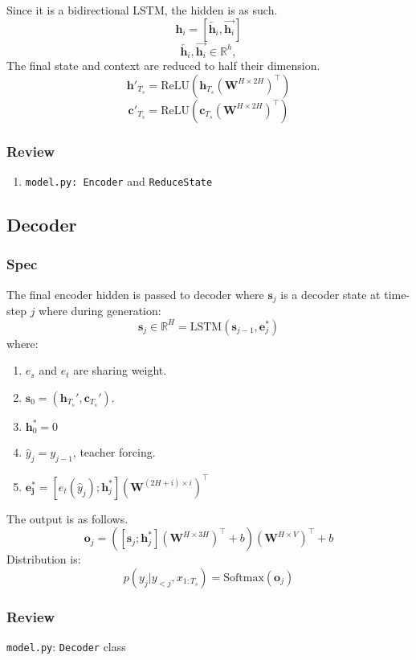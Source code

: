 \documentclass{article}
\begin{document}
  Since it is a bidirectional LSTM, the hidden is as such.
  \[
    \mathbf{h}_i = [\overleftarrow{\mathbf{h}_i}, \overrightarrow{\mathbf{h}_i}]
  \]
  \[
    \overleftarrow{\mathbf{h}_i}, \overrightarrow{\mathbf{h}_i} \in \mathbb{R}^h,
  \]
  The final state and context are reduced to half their dimension.
  \[
    \mathbf{h}'_{T_s} = \text{ReLU}(\mathbf{h}_{T_s} (\mathbf{W}^{H\times 2H})^\intercal)
  \]
  \[
    \mathbf{c}'_{T_s} = \text{ReLU}(\mathbf{c}_{T_s} (\mathbf{W}^{H\times 2H})^\intercal)
  \]
  \subsubsection{Review}
  \begin{enumerate}
    \item \texttt{model.py: Encoder} and \texttt{ReduceState}
  \end{enumerate}
  \subsection{Decoder}
  \subsubsection{Spec}
  The final encoder hidden is passed to decoder where $\mathbf{s}_j$ is a decoder state at time-step $j$ where during generation:
  \[
    \mathbf{s}_j \in \mathbb{R}^H = \text{LSTM}(\mathbf{s}_{j-1}, \mathbf{e}^*_{j})
  \]
  where:
  \begin{enumerate}
    \item $e_s$ and $e_t$ are sharing weight.
    \item $\mathbf{s}_0 = (\mathbf{h}_{T_s}',\mathbf{c}_{T_s}')$.
    \item $\mathbf{h}^*_0 = 0$
    \item $\hat{y}_j = y_{j-1}$, teacher forcing.
    \item $\mathbf{e^*_{j}} = [e_t(\hat{y}_{j}); \mathbf{h}^*_{j}] (\mathbf{W}^{(2H + i) \times i})^\intercal$
  \end{enumerate}
  The output is as follows.
  \[
    \mathbf{o}_j = ([\mathbf{s}_j;\mathbf{h}^*_j] (\mathbf{W}^{H \times 3H})^\intercal + b) (\mathbf{W}^{H\times V})^\intercal +b
  \]
  Distribution is:
  \[
    p(y_j|y_{<j}, x_{1:T_s}) = \text{Softmax}(\mathbf{o}_j)
  \]
  \subsubsection{Review}
  \texttt{model.py}: \texttt{Decoder} class
\end{document}
